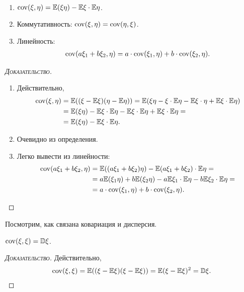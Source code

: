 \documentclass[../main.tex]{subfiles}
\begin{document}
      \begin{prop}\
       \begin{enumerate}
        \item $ \mathrm{cov}(\xi,\eta) = \mathbb E(\xi\eta) - \mathbb E\xi \cdot \mathbb E\eta $.
        \item Коммутативность: $ \mathrm{cov}(\xi,\eta)=\mathrm{cov}(\eta,\xi) $.
        \item Линейность:
         \begin{align*}
          \mathrm{cov}(a\xi_1 + b\xi_2, \eta) = a \cdot \mathrm{cov}(\xi_1,\eta) + b \cdot \mathrm{cov}(\xi_2,\eta).
         \end{align*}
       \end{enumerate}
      \end{prop}
      \begin{proof}[\normalfont\textsc{Доказательство}]\
       \begin{enumerate}
        \item Действительно,
         \begin{align*}
          \mathrm{cov}(\xi,\eta) &= \mathbb E ((\xi-\mathbb E\xi)(\eta-\mathbb E\eta)) = \mathbb E(\xi\eta - \xi \cdot \mathbb E\eta - \mathbb E\xi \cdot \eta + \mathbb E\xi \cdot \mathbb E\eta) \\
          &= \mathbb E(\xi\eta) - \mathbb E\xi \cdot \mathbb E\eta - \mathbb E\xi\cdot\mathbb E\eta + \mathbb E\xi\cdot\mathbb E\eta = \\
          &= \mathbb E(\xi\eta)-\mathbb E\xi\cdot\mathbb E\eta.
         \end{align*}
        \item Очевидно из определения.
        \item Легко вывести из линейности:
         \begin{align*}
          \mathrm{cov}(a\xi_1+b\xi_2,\eta) &= \mathbb E((a\xi_1+b\xi_2)\eta) - \mathbb E(a\xi_1+b\xi_2) \cdot \mathbb E\eta = \\
          &= a\mathbb E(\xi_1\eta) + b\mathbb E(\xi_2\eta) - a\mathbb E\xi_1 \cdot \mathbb E\eta - b \mathbb E\xi_2 \cdot \mathbb E\eta = \\
          &= a \cdot \mathrm{cov}(\xi_1,\eta) + b \cdot \mathrm{cov}(\xi_2,\eta).
         \end{align*}
       \end{enumerate}
      \end{proof}

      Посмотрим, как связана ковариация и дисперсия.

      \begin{prop}
       $\mathrm{cov}(\xi,\xi) = \mathbb D\xi$.
      \end{prop}
      \begin{proof}[\normalfont\textsc{Доказательство}]
       Действительно,
       \begin{align*}
        \mathrm{cov}(\xi,\xi)=\mathbb E((\xi-\mathbb E\xi)(\xi-\mathbb E\xi))=\mathbb E(\xi-\mathbb E\xi)^{2}=\mathbb D\xi.
       \end{align*}
      \end{proof}
\end{document}
